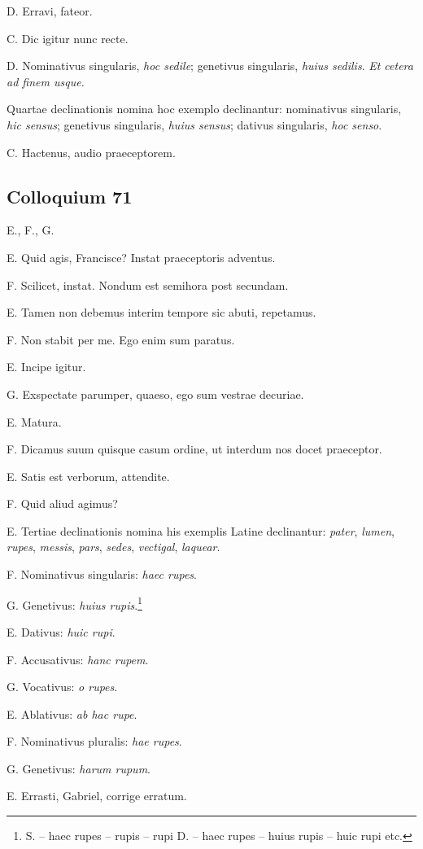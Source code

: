 \documentclass{article}
\begin{document}
D. Erravi, fateor.

C. Dic igitur nunc recte.

D. Nominativus singularis, \emph{hoc sedile}; genetivus singularis, \emph{huius sedilis}. \emph{Et cetera ad finem usque.}

Quartae declinationis nomina hoc exemplo declinantur: nominativus singularis, \emph{hic sensus}; genetivus singularis, \emph{huius sensus}; dativus singularis, \emph{hoc senso}.

C. Hactenus, audio praeceptorem.

\subsection{Colloquium 71}
E., F., G.

E. Quid agis, Francisce? Instat praeceptoris adventus.

F. Scilicet, instat. Nondum est semihora post secundam.

E. Tamen non debemus interim tempore sic abuti, repetamus.

F. Non stabit per me. Ego enim sum paratus.

E. Incipe igitur.

G. Exspectate parumper, quaeso, ego sum vestrae decuriae.

E. Matura.

F. Dicamus suum quisque casum ordine, ut interdum nos docet praeceptor.

E. Satis est verborum, attendite.

F. Quid aliud agimus?

E. Tertiae declinationis nomina his exemplis Latine declinantur: \emph{pater}, \emph{lumen}, \emph{rupes}, \emph{messis}, \emph{pars}, \emph{sedes}, \emph{vectigal}, \emph{laquear}.

F. Nominativus singularis: \emph{haec rupes}.
 
G. Genetivus: \emph{huius rupis}.\footnote{S. -- haec rupes -- rupis -- rupi D. -- haec rupes -- huius rupis -- huic rupi etc.}

E. Dativus: \emph{huic rupi}.

F. Accusativus: \emph{hanc rupem}.

G. Vocativus: \emph{o rupes}.

E. Ablativus: \emph{ab hac rupe}.

F. Nominativus pluralis: \emph{hae rupes}.

G. Genetivus: \emph{harum rupum}.

E. Errasti, Gabriel, corrige erratum.
\end{document}
